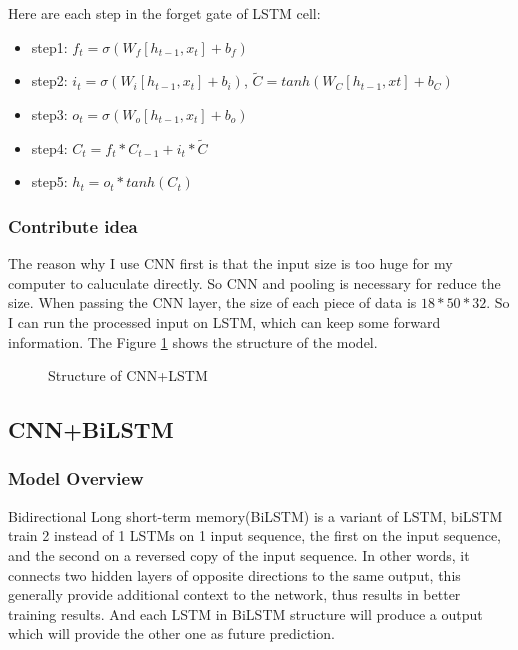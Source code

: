 \documentclass{article}
\begin{document}
Here are each step in the forget gate of LSTM cell:
\begin{itemize}
\item step1: $f_t = \sigma(W_f[h_{t-1}, x_t] + b_f)$
\item step2: $i_t = \sigma(W_i[h_{t-1}, x_t] + b_i)$,  $\widetilde{C} = tanh(W_C[h_{t-1}, xt] + b_C)$
\item step3: $o_t=\sigma(W_o[h_{t-1}, x_t] + b_o)$
\item step4: $C_t = f_t*C_{t-1} + i_t*\widetilde{C}$
\item step5: $h_t=o_t*tanh(C_t)$
\end{itemize}

\subsubsection{Contribute idea}
The reason why I use CNN first is that the input size is too huge for my computer to caluculate directly. So CNN and pooling is necessary for reduce the size. When passing the CNN layer, the size of each piece of data is $18*50*32$. So I can run the processed input on LSTM, which can keep some forward information. The Figure \ref{LSTMstruct} shows the structure of the model.

\begin{figure}[h]
	\centering
	\caption{Structure of CNN+LSTM}
	\label{LSTMstruct}
\end{figure} 

\subsection{CNN+BiLSTM}
\subsubsection{Model Overview}
Bidirectional Long short-term memory(BiLSTM) is a variant of LSTM, biLSTM train 2 instead of 1 LSTMs on 1 input sequence, the first on the input sequence, and the second on a reversed copy of the input sequence. In other words, it connects two hidden layers of opposite directions to the same output, this generally provide additional context to the network, thus results in better training results. And each LSTM in BiLSTM structure will produce a output which will provide the other one as future prediction. 
\end{document}
